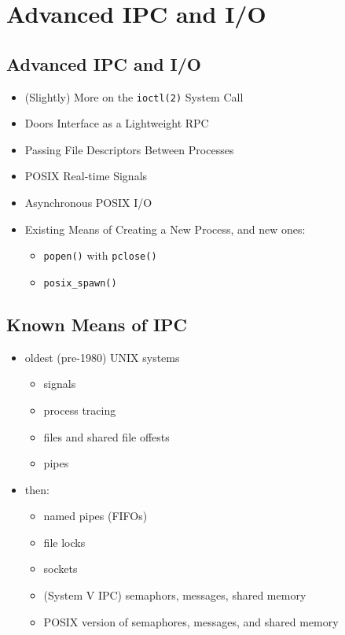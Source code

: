 
\section{Advanced IPC and I/O}


\subsection{Advanced IPC and I/O}

\begin{itemize}
\item (Slightly) More on the \texttt{ioctl(2)} System Call
\item Doors Interface as a Lightweight RPC
\item Passing File Descriptors Between Processes
\item POSIX Real-time Signals
\item Asynchronous POSIX I/O
\item Existing Means of Creating a New Process, and new ones:
	\begin{itemize}
	\item \texttt{popen()} with \texttt{pclose()}
	\item \texttt{posix\_spawn()}
	\end{itemize}
\end{itemize}

\subsection{Known Means of IPC}

\begin{itemize}
\item oldest (pre-1980) UNIX systems
	\begin{itemize}
	\item signals
	\item process tracing
	\item files and shared file offests
	\item pipes
	\end{itemize}
\item then:
	\begin{itemize}
	\item named pipes (FIFOs)
	\item file locks
	\item sockets
	\item (System V IPC) semaphors, messages, shared memory
	\item POSIX version of semaphores, messages, and shared memory
	\end{itemize}
\end{itemize}

